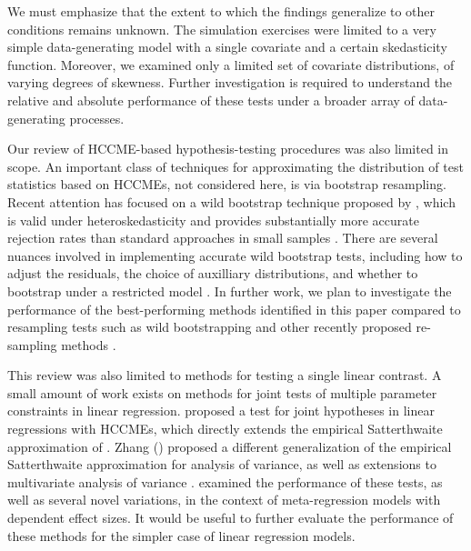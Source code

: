 \documentclass[12pt]{article}\usepackage[]{graphicx}\usepackage[]{color}
\begin{document}
We must emphasize that the extent to which the findings generalize to other conditions remains unknown. The simulation exercises were limited to a very simple data-generating model with a single covariate and a certain skedasticity function. Moreover, we examined only a limited set of covariate distributions, of varying degrees of skewness. Further investigation is required to understand the relative and absolute performance of these tests under a broader array of data-generating processes.

Our review of HCCME-based hypothesis-testing procedures was also limited in scope. An important class of techniques for approximating the distribution of test statistics based on HCCMEs, not considered here, is via bootstrap resampling. 
Recent attention has focused on a wild bootstrap technique proposed by \citet{Liu1988bootstrap}, which is valid under heteroskedasticity and provides substantially more accurate rejection rates than standard approaches in small samples \citep{Flachaire2005boostrapping, Davidson2008wild}. 
There are several nuances involved in implementing accurate wild bootstrap tests, including how to adjust the residuals, the choice of auxilliary distributions, and whether to bootstrap under a restricted model \citep{MacKinnon2013thirty}. 
In further work, we plan to investigate the performance of the best-performing methods identified in this paper compared to resampling tests such as wild bootstrapping and other recently proposed re-sampling methods \citep[e.g.][]{Richard2016hetero}.

This review was also limited to methods for testing a single linear contrast. A small amount of work exists on methods for joint tests of multiple parameter constraints in linear regression. \citet{Cai2008new} proposed a test for joint hypotheses in linear regressions with HCCMEs, which directly extends the empirical Satterthwaite approximation of \citet{Lipsitz1999degrees}. Zhang (\citeyear{Zhang2012twowayANOVA, Zhang2013tests}) proposed a different generalization of the empirical Satterthwaite approximation for analysis of variance, as well as extensions to multivariate analysis of variance \citep{Zhang2012MANOVA}. \citet{Tipton2015small-F} examined the performance of these tests, as well as several novel variations, in the context of meta-regression models with dependent effect sizes. It would be useful to further evaluate the performance of these methods for the simpler case of linear regression models.
\end{document}

